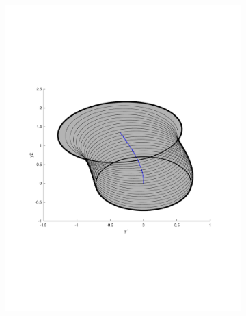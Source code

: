 \begin{figure}
\begin{subfigure}[b]{0.3\textwidth}
        \includegraphics[width=\textwidth]{figures/experiments/FunnelSOS2}
    \end{subfigure}
    \begin{subfigure}[b]{0.3\textwidth}

\end{subfigure}
\end{figure}
